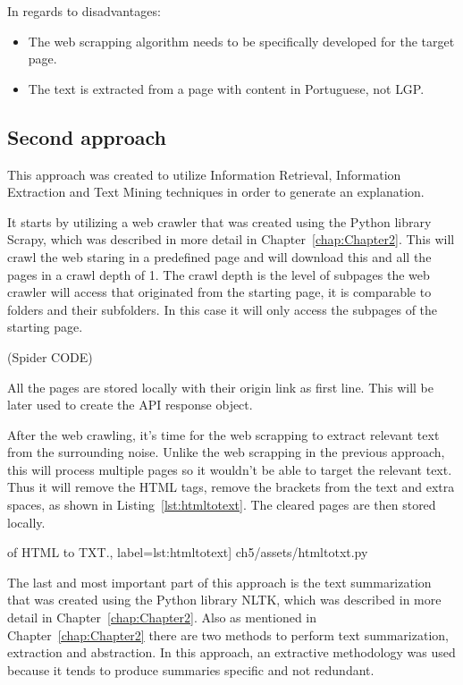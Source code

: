 In regards to disadvantages:
\begin{itemize}
        \item The web scrapping algorithm needs to be specifically developed for the target page.
        \item The text is extracted from a page with content in Portuguese, not \gls{LGP}.
\end{itemize}

\subsection{Second approach}

This approach was created to utilize Information Retrieval, Information Extraction and Text Mining techniques in order to generate an explanation.

It starts by utilizing a web crawler that was created using the Python library Scrapy, which was described in more detail in Chapter~\ref{chap:Chapter2}.
This will crawl the web staring in a predefined page and will download this and all the pages in a crawl depth of 1.
The crawl depth is the level of subpages the web crawler will access that originated from the starting page, it is comparable to folders and their subfolders.
In this case it will only access the subpages of the starting page.

(Spider CODE) %

All the pages are stored locally with their origin link as first line.
This will be later used to create the API response object.

After the web crawling, it's time for the web scrapping to extract relevant text from the surrounding noise.
Unlike the web scrapping in the previous approach, this will process multiple pages so it wouldn't be able to target the relevant text.
Thus it will remove the HTML tags, remove the brackets from the text and extra spaces, as shown in Listing~\ref{lst:htmltotext}.
The cleared pages are then stored locally.

\begin{center}
\begin{minipage}{0.95\linewidth}
 of HTML to TXT.,
label=lst:htmltotext]
{ch5/assets/htmltotxt.py}
\end{minipage}
\end{center}

The last and most important part of this approach is the text summarization that was created using the Python library NLTK, which was described in more detail in Chapter~\ref{chap:Chapter2}.
Also as mentioned in Chapter~\ref{chap:Chapter2} there are two methods to perform text summarization, extraction and abstraction.
In this approach, an extractive methodology was used because it tends to produce summaries specific and not redundant\cite{cheung2008comparing}.


